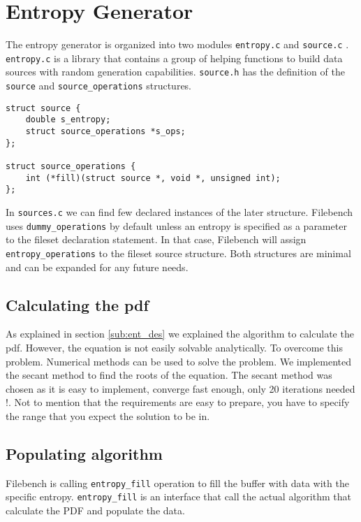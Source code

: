 \section{Entropy Generator}\label{sec:ent_imp}

The entropy generator is organized into two modules \verb+entropy.c+ and \verb+source.c+ . \verb+entropy.c+ is a library that contains a group of helping functions to build
 data sources with random generation capabilities. \verb+source.h+ has the definition of the \verb+source+ and \verb+source_operations+ structures.
\lstset{language=C}
\begin{lstlisting}
struct source {
    double s_entropy;
    struct source_operations *s_ops; 
};

struct source_operations {
    int (*fill)(struct source *, void *, unsigned int);
};

\end{lstlisting}


 In \verb+sources.c+ we can find few declared instances of the later structure. Filebench uses \verb+dummy_operations+ by default unless an entropy is specified as a parameter to the fileset declaration statement.
 In that case, Filebench will assign \verb+entropy_operations+ to the fileset source structure. Both structures are minimal and can be expanded for any future needs.

\subsection{Calculating the pdf}

As explained in section \ref{sub:ent_des} we explained the algorithm to calculate the pdf.
However, the equation is not easily solvable analytically. To overcome this problem. Numerical methods can be used to solve the problem. We implemented the secant method to find the roots of the equation. The secant method was chosen as it is easy to implement, converge fast enough, only 20 iterations needed !. Not to mention that the requirements are easy to prepare, you have to specify the range that you expect the solution to be in.


\subsection{Populating algorithm}

Filebench is calling \verb+entropy_fill+ operation to fill the buffer with data with the specific entropy. \verb+entropy_fill+ is an interface that call the actual algorithm that calculate the PDF and populate the data.

